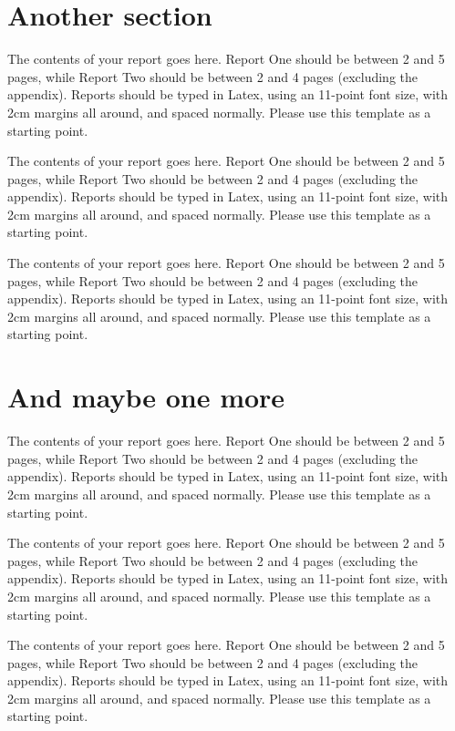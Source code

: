 \documentclass[a4paper,11pt]{article}
\begin{document}
\section{Another section}

The contents of your report goes here.  Report One should be between 2
and 5 pages, while Report Two should be between 2 and 4 pages
(excluding the appendix).  Reports should be typed in Latex, using an
11-point font size, with 2cm margins all around, and spaced normally.
Please use this template as a starting point.

The contents of your report goes here.  Report One should be between 2
and 5 pages, while Report Two should be between 2 and 4 pages
(excluding the appendix).  Reports should be typed in Latex, using an
11-point font size, with 2cm margins all around, and spaced normally.
Please use this template as a starting point.

The contents of your report goes here.  Report One should be between 2
and 5 pages, while Report Two should be between 2 and 4 pages
(excluding the appendix).  Reports should be typed in Latex, using an
11-point font size, with 2cm margins all around, and spaced normally.
Please use this template as a starting point.


\section{And maybe one more}

The contents of your report goes here.  Report One should be between 2
and 5 pages, while Report Two should be between 2 and 4 pages
(excluding the appendix).  Reports should be typed in Latex, using an
11-point font size, with 2cm margins all around, and spaced normally.
Please use this template as a starting point.

The contents of your report goes here.  Report One should be between 2
and 5 pages, while Report Two should be between 2 and 4 pages
(excluding the appendix).  Reports should be typed in Latex, using an
11-point font size, with 2cm margins all around, and spaced normally.
Please use this template as a starting point.

The contents of your report goes here.  Report One should be between 2
and 5 pages, while Report Two should be between 2 and 4 pages
(excluding the appendix).  Reports should be typed in Latex, using an
11-point font size, with 2cm margins all around, and spaced normally.
Please use this template as a starting point.
\end{document}
